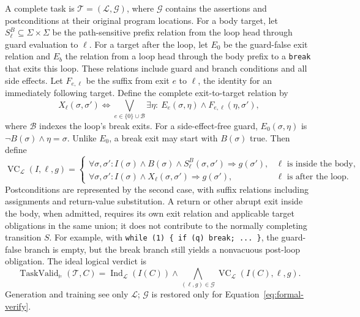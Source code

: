 A complete task is \(\mathcal T=(\mathcal L,\mathcal G)\), where
\(\mathcal G\) contains the assertions and postconditions at their original
program locations.  For a body target, let
\(S^{B}_{\ell}\subseteq\Sigma\times\Sigma\) be the path-sensitive prefix
relation from the loop head through guard evaluation to \(\ell\).
For a target after the loop, let \(E_0\) be the guard-false exit relation
and \(E_b\) the relation from a loop head through the body prefix to a
\texttt{break} that exits this loop.  These relations include guard and
branch conditions and all side effects.  Let \(F_{e,\ell}\) be the suffix
from exit \(e\) to \(\ell\), the identity for an immediately following
target.  Define the complete exit-to-target relation by
\[
 X_\ell(\sigma,\sigma')\iff
 \bigvee_{e\in\{0\}\cup\mathcal B}
 \exists\eta:\ E_e(\sigma,\eta)\land F_{e,\ell}(\eta,\sigma'),
\]
where \(\mathcal B\) indexes the loop's break exits.  For a side-effect-free
guard, \(E_0(\sigma,\eta)\) is \(\neg B(\sigma)\land\eta=\sigma\).
Unlike \(E_0\), a break exit may start with \(B(\sigma)\) true.
Then define
\begin{equation}
  \operatorname{VC}_{\mathcal L}(I,\ell,g)=
  \begin{cases}
    \forall\sigma,\sigma':
    I(\sigma)\land B(\sigma)\land S^{B}_{\ell}(\sigma,\sigma')
    \Rightarrow g(\sigma'),
      & \ell\text{ is inside the body},\\
    \forall\sigma,\sigma':
    I(\sigma)\land X_\ell(\sigma,\sigma')
    \Rightarrow g(\sigma'),
      & \ell\text{ is after the loop}.
  \end{cases}
  \label{eq:formal-target-vc}
\end{equation}
Postconditions are represented by the second case, with suffix relations
including assignments and return-value substitution.  A return or other
abrupt exit inside the body, when admitted, requires its own exit relation
and applicable target obligations in the same union; it does not contribute
to the normally completing transition \(S\).  For example, with
\texttt{while (1) \{ if (q) break; ... \}}, the guard-false branch is empty,
but the break branch still yields a nonvacuous post-loop obligation.
The ideal logical verdict is
\begin{equation}
  \operatorname{TaskValid}_{\models}(\mathcal T,C)
  =\operatorname{Ind}_{\mathcal L}(I(C))\land
   \bigwedge_{(\ell,g)\in\mathcal G}
   \operatorname{VC}_{\mathcal L}(I(C),\ell,g).
  \label{eq:formal-verify}
\end{equation}
Generation and training see only \(\mathcal L\); \(\mathcal G\) is restored
only for Equation~\eqref{eq:formal-verify}.

